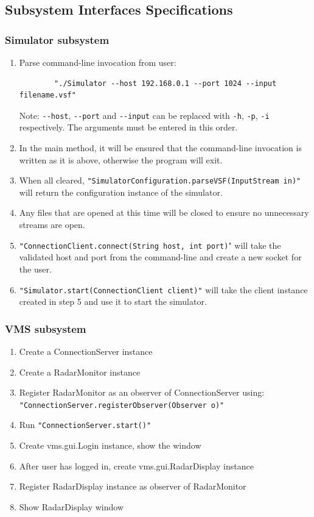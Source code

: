 \documentclass{article}
\begin{document}
\break

\subsection{Subsystem Interfaces Specifications} %

\subsubsection{Simulator subsystem} %

\begin{enumerate}
  \item Parse command-line invocation from user: 
		\begin{verbatim}
		"./Simulator --host 192.168.0.1 --port 1024 --input filename.vsf"
		\end{verbatim}
		Note: \verb|--host|, \verb|--port| and \verb|--input| can be replaced with \verb|-h|, \verb|-p|, \verb|-i| respectively.
		\newline The arguments must be entered in this order.
  \item In the main method, it will be ensured that the command-line invocation is written as it is above, otherwise the program will exit.
  \item When all cleared, \verb|"SimulatorConfiguration.parseVSF(InputStream in)"| will return the configuration instance of the simulator.
  \item Any files that are opened at this time will be closed to ensure no unnecessary streams are open.
	\item \verb|"ConnectionClient.connect(String host, int port)|" will take the validated host and port from the command-line and create a new socket for the user.
	\item \verb|"Simulator.start(ConnectionClient client)"| will take the client instance created in step 5 and use it to start the simulator.	
\end{enumerate}

\subsubsection{VMS subsystem} %

\begin{enumerate}
	\item	Create a ConnectionServer instance
	\item Create a RadarMonitor instance
	\item Register RadarMonitor as an observer of ConnectionServer using:
		\newline \verb|"ConnectionServer.registerObserver(Observer o)"|
	\item Run \verb|"ConnectionServer.start()"|
	\item  Create vms.gui.Login instance, show the window
	\item After user has logged in, create vms.gui.RadarDisplay instance
	\item Register RadarDisplay instance as observer of RadarMonitor
	\item Show RadarDisplay window
\end{enumerate}
\end{document}

